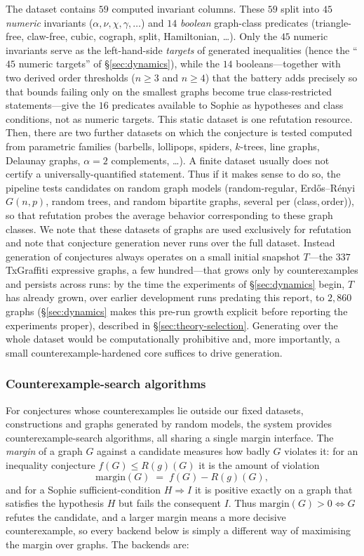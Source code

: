 \documentclass[]{ceurart}
\begin{document}
The dataset contains $59$ computed invariant
columns. These $59$ split into $45$ \emph{numeric} invariants ($\alpha,\nu,\chi,\gamma,\dots$) and $14$
\emph{boolean} graph-class predicates (triangle-free, claw-free, cubic, cograph, split, Hamiltonian,
\dots). Only the $45$ numeric invariants serve as the left-hand-side \emph{targets} of generated
inequalities (hence the ``$45$ numeric targets'' of \S\ref{sec:dynamics}), while the $14$ booleans---together with two
derived order thresholds ($n\ge 3$ and $n\ge 4$) that the battery adds precisely so that
bounds failing only on the smallest graphs become true class-restricted statements---give the
$16$ predicates available to Sophie as hypotheses and class conditions, not as numeric targets. This static
dataset is one refutation resource. Then, there are two further datasets on which the conjecture is tested computed from parametric families (barbells, lollipops,
spiders, $k$-trees, line graphs, Delaunay graphs, $\alpha=2$ complements, \dots). A finite dataset usually does not certify a universally-quantified statement. Thus if it makes sense to do so, the pipeline tests candidates on random graph models (random-regular, Erd\H{o}s--R\'enyi $G(n,p)$, random trees,
and random bipartite graphs, several per (class,\,order)), so that refutation probes the average behavior corresponding to these graph classes.  We note that these datasets of graphs are used exclusively for refutation and note that conjecture generation never runs over the full dataset. Instead generation of conjectures always operates on a small initial snapshot $T$---the $337$ TxGraffiti expressive graphs, a few hundred---that grows only by counterexamples and persists across runs: by the time the experiments of \S\ref{sec:dynamics} begin, $T$ has already grown, over earlier development runs predating this report, to $2{,}860$ graphs (\S\ref{sec:dynamics} makes this pre-run growth explicit before reporting the experiments proper), described in \S\ref{sec:theory-selection}. Generating over the whole dataset would be computationally prohibitive and, more importantly, a small counterexample-hardened core suffices to drive generation.

\subsubsection{Counterexample-search algorithms}
\label{sec:engine}
\label{sec:backends}

For conjectures whose counterexamples lie outside our fixed datasets, constructions and graphs generated by random models, the system
provides counterexample-search algorithms, all sharing a single
margin interface. The \emph{margin} of a graph $G$ against
a candidate measures how badly $G$ violates it: for an inequality conjecture $f(G)\le R(g)(G)$ it is the
amount of violation
\[
  \mathrm{margin}(G) \;=\; f(G) - R(g)(G),
\]
and for a Sophie sufficient-condition $H\Rightarrow I$ it is positive exactly on a graph that
satisfies the hypothesis $H$ but fails the consequent $I$. Thus $\mathrm{margin}(G)>0\iff G$ refutes the
candidate, and a larger margin means a more decisive counterexample, so every backend below is simply a
different way of maximising the margin over graphs. The
backends are:
\end{document}
